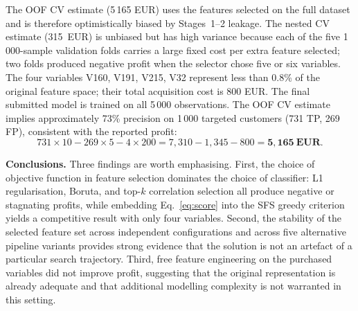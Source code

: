 \documentclass[11pt,a4paper]{article}
\begin{document}
The OOF CV estimate (5\,165 EUR) uses the features selected on the full dataset and is
therefore optimistically biased by Stages~1--2 leakage.
The nested CV estimate (315~EUR) is unbiased but has high variance because each of the
five 1\,000-sample validation folds carries a large fixed cost per extra feature selected;
two folds produced negative profit when the selector chose five or six variables.
The four variables V160, V191, V215, V32 represent less than 0.8\% of the original feature
space; their total acquisition cost is 800 EUR.  The final submitted model is trained on all
5\,000 observations.  The OOF CV estimate implies approximately 73\% precision on
1\,000 targeted customers (731 TP, 269 FP), consistent with the reported profit:
\[
    731 \times 10 - 269 \times 5 - 4 \times 200 = 7{,}310 - 1{,}345 - 800 = \mathbf{5{,}165~\text{EUR}}.
\]

\textbf{Conclusions.}
Three findings are worth emphasising.
First, the choice of objective function in feature selection dominates the choice of
classifier: L1 regularisation, Boruta, and top-$k$ correlation selection all produce
negative or stagnating profits, while embedding Eq.~\eqref{eq:score} into the SFS greedy
criterion yields a competitive result with only four variables.
Second, the stability of the selected feature set across independent configurations
and across five alternative pipeline variants provides strong evidence that the solution
is not an artefact of a particular search trajectory.
Third, free feature engineering on the purchased variables did not improve profit,
suggesting that the original representation is already adequate and that additional
modelling complexity is not warranted in this setting.
\end{document}
